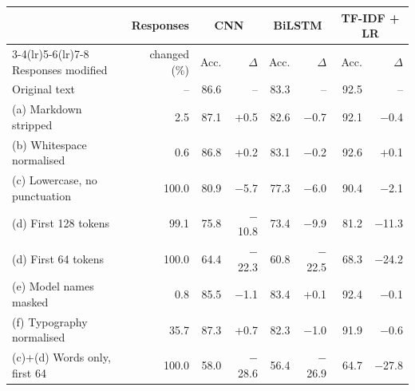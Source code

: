 \begin{tabular}{lrrrrrrr}
\toprule
 & Responses & \multicolumn{2}{c}{CNN} & \multicolumn{2}{c}{BiLSTM} & \multicolumn{2}{c}{TF-IDF + LR} \\
\cmidrule(lr){3-4}\cmidrule(lr){5-6}\cmidrule(lr){7-8}
Responses modified & changed (\%) & Acc. & $\Delta$ & Acc. & $\Delta$ & Acc. & $\Delta$ \\
\midrule
Original text & -- & 86.6 & -- & 83.3 & -- & 92.5 & -- \\
\midrule
(a) Markdown stripped & 2.5 & 87.1 & +0.5 & 82.6 & $-$0.7 & 92.1 & $-$0.4 \\
(b) Whitespace normalised & 0.6 & 86.8 & +0.2 & 83.1 & $-$0.2 & 92.6 & +0.1 \\
(c) Lowercase, no punctuation & 100.0 & 80.9 & $-$5.7 & 77.3 & $-$6.0 & 90.4 & $-$2.1 \\
(d) First 128 tokens & 99.1 & 75.8 & $-$10.8 & 73.4 & $-$9.9 & 81.2 & $-$11.3 \\
(d) First 64 tokens & 100.0 & 64.4 & $-$22.3 & 60.8 & $-$22.5 & 68.3 & $-$24.2 \\
(e) Model names masked & 0.8 & 85.5 & $-$1.1 & 83.4 & +0.1 & 92.4 & $-$0.1 \\
(f) Typography normalised & 35.7 & 87.3 & +0.7 & 82.3 & $-$1.0 & 91.9 & $-$0.6 \\
(c)+(d) Words only, first 64 & 100.0 & 58.0 & $-$28.6 & 56.4 & $-$26.9 & 64.7 & $-$27.8 \\
\bottomrule
\end{tabular}
